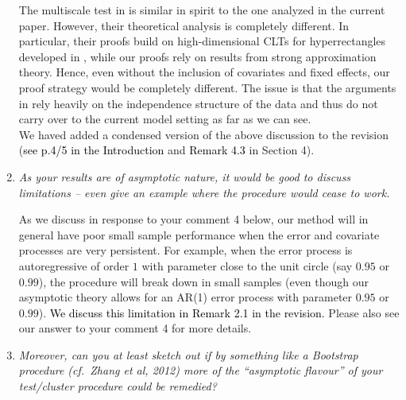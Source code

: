 \documentclass[a4paper,12pt]{article}
\newcommand{\reference}[1]{\textcolor{black}{#1}}
\begin{document}
\begin{enumerate}[label=\arabic*.,leftmargin=0.6cm]
The multiscale test in \cite{KhismatullinaVogt2023} is similar in spirit to the one analyzed in the current paper. However, their theoretical analysis is completely different. In particular, their proofs build on high-dimensional CLTs for hyperrectangles developed in \cite{Chernozhukov2017}, while our proofs rely on results from strong approximation theory. Hence, even without the inclusion of covariates and fixed effects, our proof strategy would be completely different. The issue is that the arguments in \cite{KhismatullinaVogt2023} rely heavily on the independence structure of the data and thus do not carry over to the current model setting as far as we can see. \\
We haved added a condensed version of the above discussion to the revision (\reference{see p.4/5 in the Introduction} and \reference{Remark 4.3} in Section 4). 


\item \textit{As your results are of asymptotic nature, it would be good to discuss limitations -- even give an example where the procedure would cease to work.}  

As we discuss in response to your comment 4 below, our method will in general have poor small sample performance when the error and covariate processes are very persistent. For example, when the error process is autoregressive of order $1$ with parameter close to the unit circle (say $0.95$ or $0.99$), the procedure will break down in small samples (even though our asymptotic theory allows for an AR(1) error process with parameter $0.95$ or $0.99$). \reference{We discuss this limitation in Remark 2.1 in the revision.} Please also see our answer to your comment 4 for more details.
  

\item \textit{Moreover, can you at least sketch out if by something like a Bootstrap procedure (cf.\ Zhang et al, 2012) more of the ``asymptotic flavour'' of your test/cluster procedure could be remedied?}


\end{enumerate}
\end{document}
